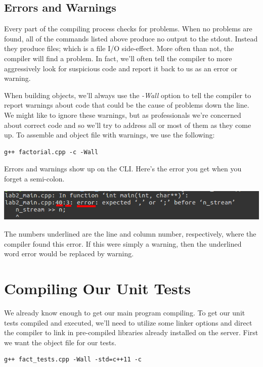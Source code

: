 \documentclass[]{tufte-handout}
\begin{document}
\subsection{Errors and Warnings}

Every part of the compiling process checks for problems. When no problems are found, all of the commands listed above produce no output to the stdout.  Instead they produce files; which is a file \textsc{I/O} side-effect.  More often than not, the compiler will find a problem. In fact, we'll often tell the compiler to more aggressively look for suspicious code and report it back to us as an error or warning.  

When building objects, we'll always use the \textit{-Wall} option to tell the compiler to report warnings about code that could be the cause of problems down the line. We might like to ignore these warnings, but as professionals we're concerned about correct code and so we'll try to address all or most of them as they come up.  To assemble and object file with warnings, we use the following:
\begin{verbatim}
g++ factorial.cpp -c -Wall 
\end{verbatim}

Errors and warnings show up on the CLI. Here's the error you get when you forget a semi-colon.
\vspace{.1in}
\begin{center}
\includegraphics[scale=.5]{compiler-error.png}
\end{center}
\vspace{.1in}
The numbers underlined are the line and column number, respectively, where the compiler found this error. If this were simply a warning, then the underlined word error would be replaced by warning.  


\section{Compiling Our Unit Tests}

We already know enough to get our main program compiling. To get our unit tests compiled and executed, we'll need to utilize some linker options and direct the compiler to link in pre-compiled libraries already installed on the server. First we want the object file for our tests.
\begin{verbatim}
g++ fact_tests.cpp -Wall -std=c++11 -c
\end{verbatim}
\end{document}
